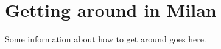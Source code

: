\newpage
\section*{Getting around in Milan}
\label{getting-around}
\pagestyle{cropmarksstyle}

Some information about how to get around goes here.
